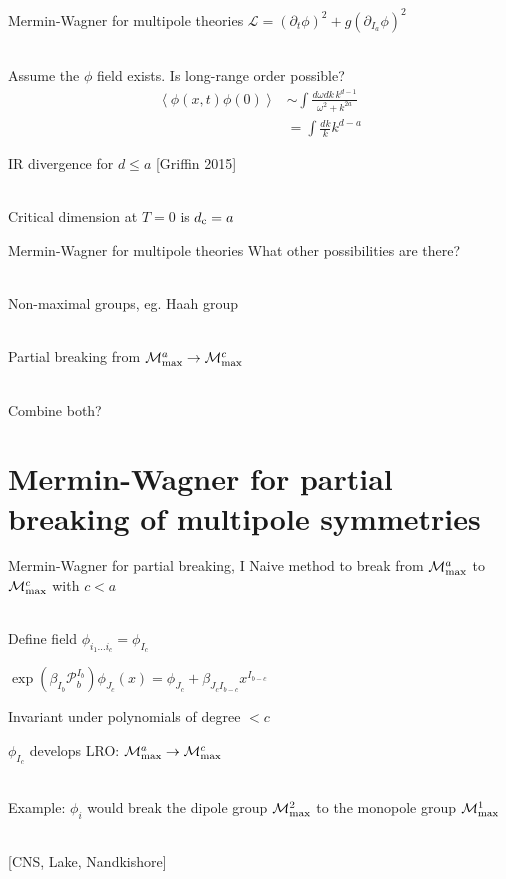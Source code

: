\documentclass{beamer}
\renewcommand{\P}{\mathcal{P}}
\renewcommand{\L}{\mathcal{L}}
\newcommand{\M}[1]{\mathcal{M}_{\rm max}^{#1}}
\newcommand{\I}[1]{{I_{#1}}}
\newcommand{\J}[1]{{J_{#1}}}
\begin{document}
\begin{frame}{Mermin-Wagner for multipole theories}
$\L = (\partial_t \phi)^2 + g (\partial_{I_a} \phi)^2$\\\

Assume the $\phi$ field exists. Is long-range order possible?
\begin{align*}
\left\langle \phi(x,t) \phi(0) \right\rangle &\sim \int \frac{d\omega dk\, k^{d-1}}{\omega^2 + k^{2a}}\\
&= \int \frac{dk}{k} k^{d-a}
\end{align*}

IR divergence for $d\le a$ [Griffin 2015]\\\

Critical dimension at $T=0$ is $d_{\rm c} = a$
\end{frame}

\begin{frame}{Mermin-Wagner for multipole theories}
What other possibilities are there?\\\

Non-maximal groups, eg. Haah group\\\

Partial breaking from $\M{a} \rightarrow \M{c}$\\\

Combine both?
\end{frame}

\section{Mermin-Wagner for partial breaking of multipole symmetries}

\begin{frame}{Mermin-Wagner for partial breaking, I}
Naive method to break from $\M{a}$ to $\M{c}$ with $c<a$\\\

Define field $\phi_{i_1\dots i_c} = \phi_\I{c}$

\setlength{\leftskip}{1cm}

$\exp(\beta_{I_b} \P_b^{I_b})\phi_{J_{c}}(x) = \phi_\J{c} + \beta_{\J{c}\I{b-c}} x^\I{b-c}$

Invariant under polynomials of degree $<c$

$\phi_\I{c}$ develops LRO: $\M{a} \rightarrow \M{c}$\\\

\setlength{\leftskip}{0cm}

Example: $\phi_i$ would break the dipole group $\M{2}$ to the monopole group $\M{1}$\\\

[CNS, Lake, Nandkishore]
\end{frame}
\end{document}
